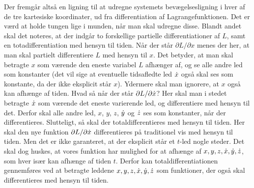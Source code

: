 Der fremgår altså en ligning til at udregne systemets bevægelsesligning i hver af de tre kartesiske koordinater, ud fra differentiation af Lagrangefunktionen. Det er værd at holde tungen lige i munden, når man skal udregne disse. Blandt andet skal det noteres, at der indgår to forskellige partielle differentiationer af $L$, samt en totadifferentiation med hensyn til tiden. Når der står $\partial L/\partial x$ menes der her, at man skal partielt differentiere $L$ med hensyn til $x$. Det betyder, at man skal betragte $x$ som værende den eneste variabel $L$ afhænger af, og se alle andre led som konstanter (det vil sige at eventuelle tidsafledte led $\dot{x}$ også skal ses som konstante, da der ikke eksplicit står $x$). Ydermere skal man ignorere, at $x$ også kan afhænge af tiden. Hvad så når der står $\partial L/\partial\dot{x}$? Her skal man i stedet betragte $\dot{x}$ som værende det eneste varierende led, og differentiere med hensyn til det. Derfor skal alle andre led, $x$, $y$, $z$, $\dot{y}$ og $\dot{z}$ ses som konstanter, når der differentieres. Slutteligt, så skal der totaldifferentieres med hensyn til tiden. Her skal den nye funktion $\partial L/\partial\dot{x}$ differentieres på traditionel vis med hensyn til tiden. Men det er ikke garanteret, at der eksplicit står et $t$-led nogle steder. Det skal dog huskes, at vores funktion har mulighed for at afhænge af $x,y,z,\dot{x},\dot{y},\dot{z}$, som hver især kan afhænge af tiden $t$. Derfor kan totaldifferentiationen gennemføres ved at betragte leddene $x,y,z,\dot{x},\dot{y},\dot{z}$ som funktioner, der også skal differentieres med hensyn til tiden. \\ %
%

